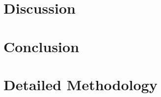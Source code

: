 \documentclass[12pt]{article}
\begin{document}
%


\clearpage
\section{Discussion}\label{sec:discussion}




\clearpage
\section{Conclusion}\label{sec:conclusion}




\appendix

\clearpage
\section{Detailed Methodology}\label{app:methodology}
\end{document}
